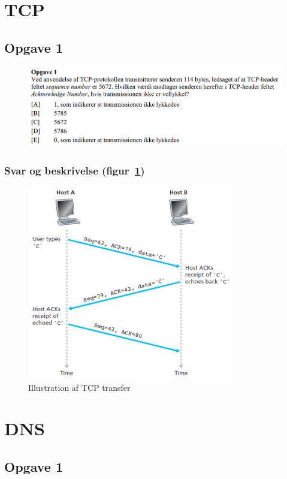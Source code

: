 \section{TCP}
\subsection{Opgave 1}
\begin{figure}[H]
	\centering
	\includegraphics[width=\linewidth]{figs/tcp/SE15OP1}
	\caption{}
	\label{fig:SE15OP1}
\end{figure}

\subsubsection{Svar og beskrivelse (figur~\ref{fig:SE15OP1})}

\begin{figure}[H]
	\centering
	\includegraphics[width=0.8\textwidth]{figs/tcp/tcptransfer}
	\caption{Illustration af TCP transfer}
	\label{fig:TCPtransfer}
\end{figure}

\section{DNS}
\subsection{Opgave 1}



